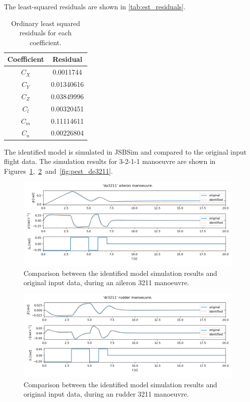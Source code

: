 The least-squared residuals are shown in \autoref{tab:est_residuals}. 

\begin{table}[h]
    \begin{center}
    \begin{tabular}{ c | c}
    Coefficient & Residual \\
    \hline\hline
    ${C_X}$ & 0.0011744 \\ 
    ${C_Y}$ & 0.01340616 \\
    ${C_Z}$ & 0.03849996 \\
    ${C_l}$ & 0.00320451 \\
    ${C_m}$ & 0.11114611 \\
    ${C_n}$ & 0.00226804 
    \end{tabular}
    \end{center}
    \caption{Ordinary least squared residuals for each coefficient.}
    \label{tab:est_residuals}
    \end{table}

The identified model is simulated in JSBSim and compared to the original input flight data. The simulation results for 3-2-1-1 manoeuvre are shown in Figures~\ref{fig:pest_da3211},~\ref{fig:pest_dr3211}~and~\ref{fig:pest_de3211}.\\

\begin{figure}
    \centering
    \includegraphics[width=14cm]{figures/pest_da3211.png}
    \caption{Comparison between the identified model simulation results and original input data, during an aileron 3211 manoeuvre.}
    \label{fig:pest_da3211}
\end{figure}

\begin{figure}
    \centering
    \includegraphics[width=14cm]{figures/pest_dr3211.png}
    \caption{Comparison between the identified model simulation results and original input data, during an rudder 3211 manoeuvre.}
    \label{fig:pest_dr3211}
\end{figure}

